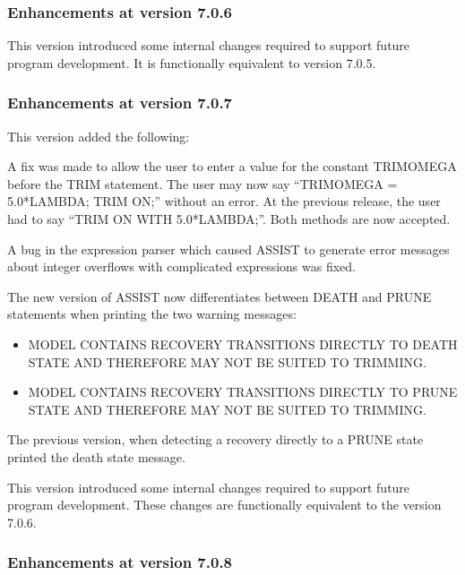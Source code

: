 \subsubsection{Enhancements at version 7.0.6}

This version introduced some internal changes required to support future
program development.   It is functionally equivalent to version 7.0.5.

\subsubsection{Enhancements at version 7.0.7}

This version added the following:
\begin{indenteditems}
\item A fix was made to allow the user to enter a value for the
      constant TRIMOMEGA before the TRIM statement.   The user 
      may now say ``TRIMOMEGA = 5.0*LAMBDA; TRIM ON;'' without
      an error.   At the previous release, the user had to say
      ``TRIM ON WITH 5.0*LAMBDA;''.   Both methods are now accepted.
\item A bug in the expression parser which caused ASSIST to generate error
      messages about integer overflows with complicated expressions was fixed.
\item The new version of ASSIST now differentiates between DEATH and PRUNE
      statements when printing the two warning messages:
      \begin{itemize}
          \item MODEL CONTAINS RECOVERY TRANSITIONS DIRECTLY TO DEATH
                STATE AND THEREFORE MAY NOT BE SUITED TO TRIMMING.
          \item MODEL CONTAINS RECOVERY TRANSITIONS DIRECTLY TO PRUNE
                STATE AND THEREFORE MAY NOT BE SUITED TO TRIMMING.
      \end{itemize}
      The previous version, when detecting a recovery directly to a PRUNE
      state printed the death state message.
\item This version introduced some internal changes required to support future
      program development.   These changes are functionally equivalent to
      the version 7.0.6.
\end{indenteditems}

\subsubsection{Enhancements at version 7.0.8}


